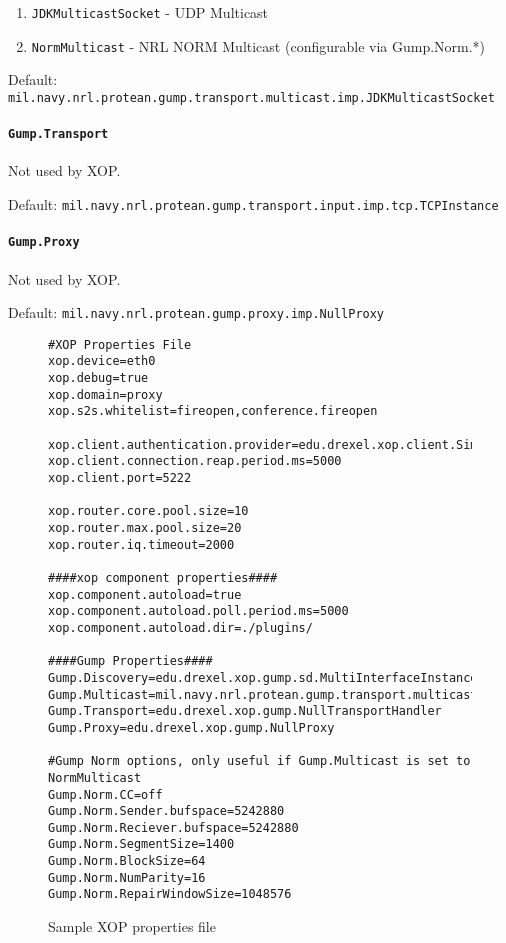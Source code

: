 \documentclass[draft]{article}
\begin{document}
\begin{enumerate}
    \item \texttt{JDKMulticastSocket} - UDP Multicast
    \item \texttt{NormMulticast} - NRL NORM Multicast (configurable via Gump.Norm.*)
\end{enumerate}

Default: \texttt{mil.navy.nrl.protean.gump.transport.multicast.imp.JDKMulticastSocket}
\paragraph{\texttt{Gump.Transport}}
Not used by XOP.

Default: \texttt{mil.navy.nrl.protean.gump.transport.input.imp.tcp.TCPInstance}
\paragraph{\texttt{Gump.Proxy}}
Not used by XOP.

Default: \texttt{mil.navy.nrl.protean.gump.proxy.imp.NullProxy}
\begin{figure}
\begin{verbatim}
#XOP Properties File
xop.device=eth0
xop.debug=true
xop.domain=proxy
xop.s2s.whitelist=fireopen,conference.fireopen

xop.client.authentication.provider=edu.drexel.xop.client.SimpleAuthenticationProvider
xop.client.connection.reap.period.ms=5000
xop.client.port=5222

xop.router.core.pool.size=10
xop.router.max.pool.size=20
xop.router.iq.timeout=2000

####xop component properties####
xop.component.autoload=true
xop.component.autoload.poll.period.ms=5000
xop.component.autoload.dir=./plugins/

####Gump Properties####
Gump.Discovery=edu.drexel.xop.gump.sd.MultiInterfaceInstance
Gump.Multicast=mil.navy.nrl.protean.gump.transport.multicast.imp.JDKMulticastSocket
Gump.Transport=edu.drexel.xop.gump.NullTransportHandler
Gump.Proxy=edu.drexel.xop.gump.NullProxy

#Gump Norm options, only useful if Gump.Multicast is set to NormMulticast
Gump.Norm.CC=off
Gump.Norm.Sender.bufspace=5242880
Gump.Norm.Reciever.bufspace=5242880
Gump.Norm.SegmentSize=1400
Gump.Norm.BlockSize=64
Gump.Norm.NumParity=16
Gump.Norm.RepairWindowSize=1048576

\end{verbatim}
\caption{Sample XOP properties file}
\label{fig:sample-config-file}
\end{figure}
\end{document}
